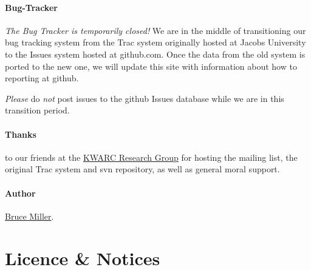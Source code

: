 \documentclass{article}
\begin{document}
\paragraph{Bug-Tracker}
\emph{The Bug Tracker is temporarily closed! }
We are in the middle of transitioning our bug tracking system
from the Trac system originally hosted at Jacobs University
to the Issues system hosted at github.com.  Once the data from the old
system is ported to the new one, we will update this site with
information about how to reporting at github.

\emph{Please} do \emph{not} post issues to the github Issues database
while we are in this transition period.



\paragraph{Thanks} to our friends at
the \href{http://kwarc.info}{KWARC Research Group}
for hosting the mailing list, the original Trac system and svn repository,
as well as general moral support.


\paragraph{Author} \href{mailto:bruce.miller@nist.gov}{Bruce Miller}.
\section{Licence \& Notices}\label{notices}
\end{document}
